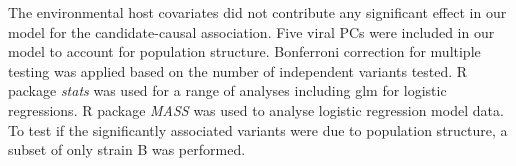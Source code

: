 \documentclass{article} %
\begin{document}

The environmental host covariates did not contribute any significant effect in our model for the candidate-causal association.
Five viral PCs were included in our model to account for population structure.
Bonferroni correction for multiple testing was applied based on the number of independent variants tested.
R package \textit{stats} was used for a range of analyses including glm for logistic regressions. 
R package \textit{MASS} was used to analyse logistic regression model data.
To test if the significantly associated variants were due to population structure, 
a subset of only strain B was performed. 
\end{document}
